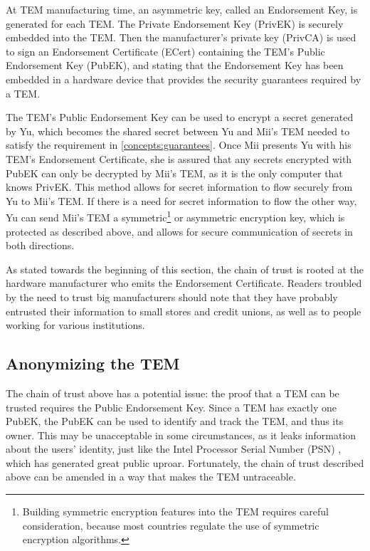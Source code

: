 At TEM manufacturing time, an asymmetric key, called an Endorsement Key,
is generated for each TEM. The Private Endorsement Key (PrivEK) is securely
embedded into the TEM. Then the manufacturer's private key (PrivCA) is used to
sign an Endorsement Certificate (ECert) containing the TEM's Public
Endorsement Key (PubEK), and stating that the Endorsement Key has been embedded
in a hardware device that provides the security guarantees required by a TEM.

The TEM's Public Endorsement Key can be used to encrypt a secret generated
by Yu, which becomes the shared secret between Yu and Mii's TEM needed to
satisfy the requirement in \ref{concepts:guarantees}. Once Mii presents Yu with
his TEM's Endorsement Certificate, she is assured that any secrets encrypted
with PubEK can only be decrypted by Mii's TEM, as it is the only computer that
knows PrivEK. This method allows for secret information to flow securely from
Yu to Mii's TEM. If there is a need for secret information to flow the other
way, Yu can send Mii's TEM a symmetric\footnote{Building symmetric encryption
features into the TEM requires careful consideration, because most countries
regulate the use of symmetric encryption algorithms.} or
asymmetric encryption key, which is protected as described above, and allows for secure
communication of secrets in both directions.

As stated towards the beginning of this section, the chain of trust is rooted
at the hardware manufacturer who emits the Endorsement Certificate. Readers
troubled by the need to trust big manufacturers should note that they have
probably entrusted their information to small stores and credit unions, as well
as to people working for various institutions.

\subsection{Anonymizing the TEM}\label{concepts:anonymous_trust}
The chain of trust above has a potential issue: the proof that a TEM can be
trusted requires the Public Endorsement Key. Since a TEM has exactly one PubEK,
the PubEK can be used to identify and track the TEM, and thus its owner. This
may be unacceptable in some circumstances, as it leaks information about the
users' identity, just like the Intel Processor Serial Number (PSN)
\cite{gengler1999isi}, which has generated great public uproar. Fortunately,
the chain of trust described above can be amended in a way that makes the TEM
untraceable.

